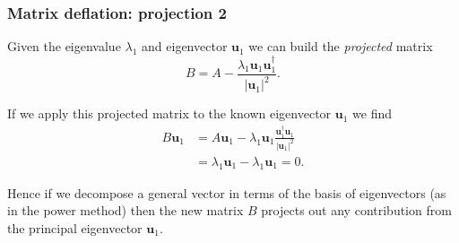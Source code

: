\documentclass{beamer}
\newcommand{\bfm}[1]{{\boldsymbol{#1}}}
\begin{document}
\begin{frame}
  \frametitle{Matrix deflation: projection 2}

  Given the eigenvalue $\lambda_1$ and eigenvector $\bfm{u}_1$ we can
  build the \emph{projected} matrix
  \begin{equation*}
    B = A - \frac{\lambda_1 \bfm{u}_1 \bfm{u}^{\dagger}_1}{| \bfm{u}_1
      |^2}.
  \end{equation*} \pause

  If we apply this projected matrix to the known eigenvector
  $\bfm{u}_1$ we find
  \begin{align*}
    B \bfm{u}_1 & = A \bfm{u}_1 - \lambda_1 \bfm{u}_1
    \frac{\bfm{u}^{\dagger}_1 \bfm{u}_1}{| \bfm{u}_1 |^2}  \\
    & =  \lambda_1 \bfm{u}_1 -  \lambda_1 \bfm{u}_1 = 0.
  \end{align*} \pause

  Hence if we decompose a general vector in terms of the basis of
  eigenvectors (as in the power method) then the new matrix $B$
  projects out any contribution from the principal eigenvector
  $\bfm{u}_1$.

\end{frame}
\end{document}
